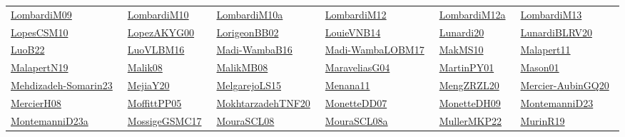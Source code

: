 \begin{longtable}{*{6}{l}}
\href{works/LombardiM09.pdf}{LombardiM09}~\cite{LombardiM09} & \href{works/LombardiM10.pdf}{LombardiM10}~\cite{LombardiM10} & \href{works/LombardiM10a.pdf}{LombardiM10a}~\cite{LombardiM10a} & \href{works/LombardiM12.pdf}{LombardiM12}~\cite{LombardiM12} & \href{works/LombardiM12a.pdf}{LombardiM12a}~\cite{LombardiM12a} & \href{works/LombardiM13.pdf}{LombardiM13}~\cite{LombardiM13}\\ 
\href{works/LopesCSM10.pdf}{LopesCSM10}~\cite{LopesCSM10} & \href{works/LopezAKYG00.pdf}{LopezAKYG00}~\cite{LopezAKYG00} & \href{works/LorigeonBB02.pdf}{LorigeonBB02}~\cite{LorigeonBB02} & \href{}{LouieVNB14}~\cite{LouieVNB14} & \href{works/Lunardi20.pdf}{Lunardi20}~\cite{Lunardi20} & \href{works/LunardiBLRV20.pdf}{LunardiBLRV20}~\cite{LunardiBLRV20}\\ 
\href{works/LuoB22.pdf}{LuoB22}~\cite{LuoB22} & \href{works/LuoVLBM16.pdf}{LuoVLBM16}~\cite{LuoVLBM16} & \href{works/Madi-WambaB16.pdf}{Madi-WambaB16}~\cite{Madi-WambaB16} & \href{works/Madi-WambaLOBM17.pdf}{Madi-WambaLOBM17}~\cite{Madi-WambaLOBM17} & \href{works/MakMS10.pdf}{MakMS10}~\cite{MakMS10} & \href{works/Malapert11.pdf}{Malapert11}~\cite{Malapert11}\\ 
\href{works/MalapertN19.pdf}{MalapertN19}~\cite{MalapertN19} & \href{works/Malik08.pdf}{Malik08}~\cite{Malik08} & \href{works/MalikMB08.pdf}{MalikMB08}~\cite{MalikMB08} & \href{works/MaraveliasG04.pdf}{MaraveliasG04}~\cite{MaraveliasG04} & \href{works/MartinPY01.pdf}{MartinPY01}~\cite{MartinPY01} & \href{works/Mason01.pdf}{Mason01}~\cite{Mason01}\\ 
\href{works/Mehdizadeh-Somarin23.pdf}{Mehdizadeh-Somarin23}~\cite{Mehdizadeh-Somarin23} & \href{works/MejiaY20.pdf}{MejiaY20}~\cite{MejiaY20} & \href{works/MelgarejoLS15.pdf}{MelgarejoLS15}~\cite{MelgarejoLS15} & \href{works/Menana11.pdf}{Menana11}~\cite{Menana11} & \href{works/MengZRZL20.pdf}{MengZRZL20}~\cite{MengZRZL20} & \href{works/Mercier-AubinGQ20.pdf}{Mercier-AubinGQ20}~\cite{Mercier-AubinGQ20}\\ 
\href{}{MercierH08}~\cite{MercierH08} & \href{works/MoffittPP05.pdf}{MoffittPP05}~\cite{MoffittPP05} & \href{works/MokhtarzadehTNF20.pdf}{MokhtarzadehTNF20}~\cite{MokhtarzadehTNF20} & \href{works/MonetteDD07.pdf}{MonetteDD07}~\cite{MonetteDD07} & \href{works/MonetteDH09.pdf}{MonetteDH09}~\cite{MonetteDH09} & \href{works/MontemanniD23.pdf}{MontemanniD23}~\cite{MontemanniD23}\\ 
\href{works/MontemanniD23a.pdf}{MontemanniD23a}~\cite{MontemanniD23a} & \href{works/MossigeGSMC17.pdf}{MossigeGSMC17}~\cite{MossigeGSMC17} & \href{works/MouraSCL08.pdf}{MouraSCL08}~\cite{MouraSCL08} & \href{works/MouraSCL08a.pdf}{MouraSCL08a}~\cite{MouraSCL08a} & \href{works/MullerMKP22.pdf}{MullerMKP22}~\cite{MullerMKP22} & \href{works/MurinR19.pdf}{MurinR19}~\cite{MurinR19}\\ 

\end{longtable}
